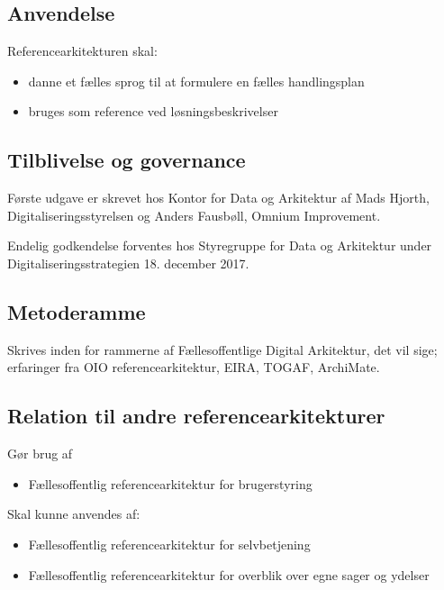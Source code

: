 \subsection{Anvendelse}\label{anvendelse}

Referencearkitekturen skal:

\begin{itemize}
\tightlist
\item
  danne et fælles sprog til at formulere en fælles handlingsplan
\item
  bruges som reference ved løsningsbeskrivelser
\end{itemize}

\subsection{Tilblivelse og governance}\label{tilblivelse-og-governance}

Første udgave er skrevet hos Kontor for Data og Arkitektur af Mads
Hjorth, Digitaliseringsstyrelsen og Anders Fausbøll, Omnium Improvement.

Endelig godkendelse forventes hos Styregruppe for Data og Arkitektur
under Digitaliseringsstrategien 18. december 2017.

\subsection{Metoderamme}\label{metoderamme}

Skrives inden for rammerne af Fællesoffentlige Digital Arkitektur, det
vil sige; erfaringer fra OIO referencearkitektur, EIRA, TOGAF,
ArchiMate.

\subsection{Relation til andre
referencearkitekturer}\label{relation-til-andre-referencearkitekturer}

Gør brug af

\begin{itemize}
\tightlist
\item
  Fællesoffentlig referencearkitektur for brugerstyring
\end{itemize}

Skal kunne anvendes af:

\begin{itemize}
\tightlist
\item
  Fællesoffentlig referencearkitektur for selvbetjening
\item
  Fællesoffentlig referencearkitektur for overblik over egne sager og
  ydelser
\end{itemize}

